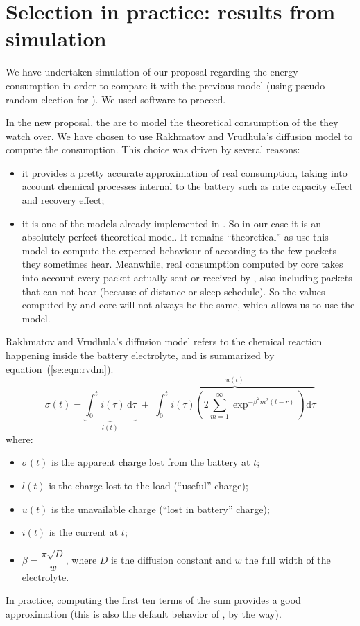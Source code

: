 \section{Selection in practice: results from simulation}
\label{se:sec:simul}

We have undertaken simulation of our proposal regarding the energy consumption in order to compare it with the previous model (using pseudo-random election for \cns).
We used \nsiii software to proceed.

In the new proposal, the \vns are to model the theoretical consumption of the \cns they watch over.
We have chosen to use Rakhmatov and Vrudhula's diffusion model\cite{RV01} to compute the consumption.
This choice was driven by several reasons:
\begin{itemize}
    \item it provides a pretty accurate approximation of real consumption, taking into account chemical processes internal to the battery such as rate capacity effect and recovery effect;
    \item it is one of the models already implemented in \nsiii. So in our case it is an absolutely perfect theoretical model.
        It remains ``theoretical'' as \vns use this model to compute the expected behaviour of \cns according to the few packets they sometimes hear. Meanwhile, real \cns consumption computed by \nsiii core takes into account every packet actually sent or received by \cns, also including packets that \vns can not hear (because of distance or sleep schedule). So the values computed by \vns and \nsiii core will not always be the same, which allows us to use the model.
\end{itemize}
Rakhmatov and Vrudhula's diffusion model refers to the chemical reaction happening inside the battery electrolyte, and is summarized by equation~(\ref{se:eqn:rvdm}).
\begin{equation}
    \label{se:eqn:rvdm}
    \sigma(t) = \underbrace{\int_{0}^{t} i(\tau) \, \mathrm d\tau}_{l(t)} \;+\; \overbrace{\int_{0}^{t} i(\tau) \left(2 \sum_{m=1}^{\infty} \exp^{-\beta^2 m^2 (t-r)} \right) \mathrm d\tau}^{u(t)}
\end{equation}
where:
\begin{itemize}
    \item $\sigma(t)$ is the apparent charge lost from the battery at $t$;
    \item $l(t)$ is the charge lost to the load (``useful'' charge);
    \item $u(t)$ is the unavailable charge (``lost in battery'' charge);
    \item $i(t)$ is the current at $t$;
    \item $\beta = \dfrac{\pi\sqrt{D}}{w}$, where $D$ is the diffusion constant and $w$ the full width of the electrolyte.
\end{itemize}
In practice, computing the first ten terms of the sum provides a good approximation (this is also the default behavior of \nsiii, by the way).

